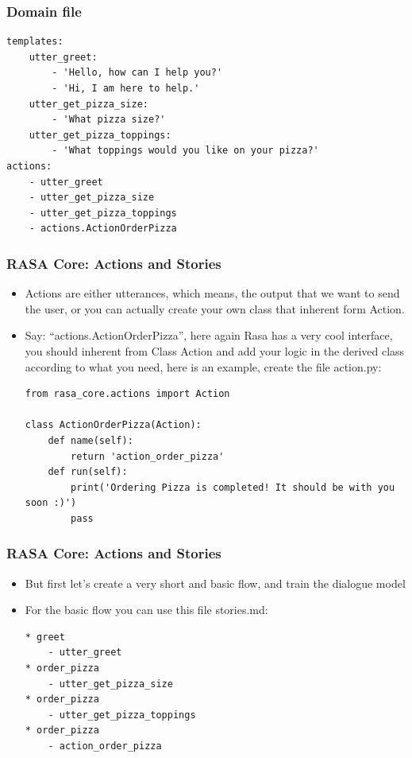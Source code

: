  \begin{frame}[fragile]\frametitle{Domain file}
\begin{lstlisting}
templates:
    utter_greet:
        - 'Hello, how can I help you?'
        - 'Hi, I am here to help.'
    utter_get_pizza_size:
        - 'What pizza size?'
    utter_get_pizza_toppings:
        - 'What toppings would you like on your pizza?'
actions:
    - utter_greet
    - utter_get_pizza_size
    - utter_get_pizza_toppings
    - actions.ActionOrderPizza
\end{lstlisting}
\end{frame}

 \begin{frame}[fragile]\frametitle{RASA Core: Actions and Stories}
\begin{itemize}
\item Actions are either utterances, which means, the output that we want to send the user, or you can actually create your own class that inherent form Action. 
\item Say: “actions.ActionOrderPizza”, here again Rasa has a very cool interface, you should inherent from Class Action and add your logic in the derived class according to what you need, here is an example, create the file action.py:
\begin{lstlisting}
from rasa_core.actions import Action

class ActionOrderPizza(Action):
    def name(self):
        return 'action_order_pizza'
    def run(self):
        print('Ordering Pizza is completed! It should be with you soon :)')
        pass
\end{lstlisting}
		
\end{itemize}

\end{frame}

 \begin{frame}[fragile]\frametitle{RASA Core: Actions and Stories}
\begin{itemize}
\item But first let’s create a very short and basic flow, and train the dialogue model
\item For the basic flow you can use this file stories.md:
\begin{lstlisting}
* greet
    - utter_greet
* order_pizza
    - utter_get_pizza_size
* order_pizza
    - utter_get_pizza_toppings
* order_pizza
    - action_order_pizza
\end{lstlisting}
		
\end{itemize}

\end{frame}

